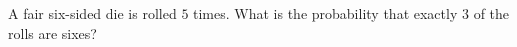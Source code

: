 A fair six-sided die is rolled $5$ times. What is the probability that exactly $3$ of the rolls are sixes?
